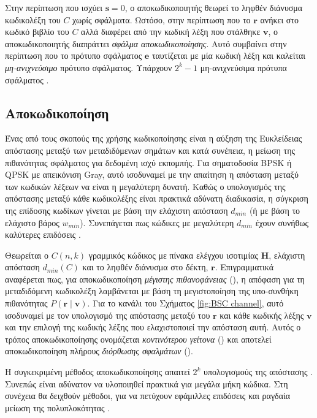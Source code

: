 Στην περίπτωση που ισχύει $\mathbf{s}=0$, ο αποκωδικοποιητής θεωρεί το ληφθέν διάνυσμα κωδικολέξη του $C$ χωρίς σφάλματα. Ωστόσο, στην περίπτωση που το $\mathbf{r}$ ανήκει στο κωδικό βιβλίο του $C$ αλλά διαφέρει από την κωδική λέξη που στάλθηκε $\mathbf{v}$, ο αποκωδικοποιητής διαπράττει \textit{σφάλμα αποκωδικοποίησης}. Αυτό συμβαίνει στην περίπτωση που το πρότυπο σφάλματος $\mathbf{e}$ ταυτίζεται με μία κωδική λέξη και καλείται \textit{μη-ανιχνεύσιμο} πρότυπο σφάλματος. Υπάρχουν $2^k-1$ μη-ανιχνεύσιμα πρότυπα σφάλματος \cite{macwilliams1977theory}.

\subsection{Αποκωδικοποίηση}

Ένας από τους σκοπούς της χρήσης κωδικοποίησης είναι η αύξηση της Ευκλείδειας απόστασης μεταξύ των μεταδιδόμενων σημάτων και κατά συνέπεια, η μείωση της πιθανότητας σφάλματος για δεδομένη ισχύ εκπομπής. Για σηματοδοσία BPSK ή QPSK με απεικόνιση Gray, αυτό ισοδυναμεί με την απαίτηση η απόσταση  μεταξύ των κωδικών λέξεων να είναι η μεγαλύτερη δυνατή. Καθώς ο υπολογισμός της απόστασης  μεταξύ κάθε κωδικολέξης είναι πρακτικά αδύνατη διαδικασία, η σύγκριση της επίδοσης κωδίκων γίνεται με βάση την ελάχιστη απόσταση $d_{min}$ (ή με βάση το ελάχιστο βάρος $w_{min}$). Συνεπάγεται πως κώδικες με μεγαλύτερη $d_{min}$ έχουν συνήθως καλύτερες επιδόσεις \cite{proakis1994communication}.

Θεωρείται ο $C(n,k)$ γραμμικός  κώδικος με πίνακα ελέγχου ισοτιμίας $\mathbf{H}$, ελάχιστη απόσταση $d_{min}(C)$ και το ληφθέν διάνυσμα στο δέκτη, $\mathbf{r}$. Επιγραμματικά αναφέρεται πως, για αποκωδικοποίηση \textit{μέγιστης πιθανοφάνειας} (), η απόφαση για τη μεταδιδόμενη κωδικολέξη λαμβάνεται με βάση τη μεγιστοποίηση της υπο-συνθήκη πιθανότητας $P(\mathbf{r}\mid\mathbf{v})$. Για το κανάλι  του Σχήματος \ref{fig:BSC channel}, αυτό ισοδυναμεί με τον υπολογισμό της απόστασης μεταξύ του $\mathbf{r}$ και κάθε κωδικής λέξης $\mathbf{v}$ και την επιλογή της κωδικής λέξης που ελαχιστοποιεί την απόσταση αυτή. Αυτός ο τρόπος αποκωδικοποίησης ονομάζεται \textit{κοντινότερου γείτονα} () και αποτελεί αποκωδικοποίηση πλήρους \textit{διόρθωσης σφαλμάτων} ().

Η συγκεκριμένη μέθοδος αποκωδικοποίησης απαιτεί $2^k$ υπολογισμούς της απόστασης . Συνεπώς είναι αδύνατον να υλοποιηθεί πρακτικά για μεγάλα μήκη κώδικα. Στη συνέχεια θα δειχθούν μέθοδοι, για να πετύχουν εφάμιλλες επιδόσεις και ραγδαία μείωση της πολυπλοκότητας \cite{ryan2009channel}.

